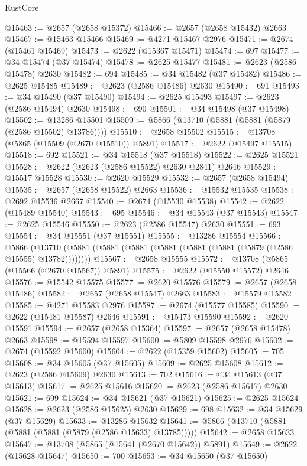 \begin{lexlean}{RustCore}
\begin{coremodule}
@15463 := @2657 (@2658 @15372)
@15466 := @2657 (@2658 @15432) @2663
@15467 := @15463 @15466
@15469 := @4271 @15467 @2976
@15471 := @2674 (@15461 @15469)
@15473 := @2622 (@15367 @15471)
@15474 := 697
@15477 := @34 @15474 (@37 @15474)
@15478 := @2625 @15477
@15481 := @2623 (@2586 @15478) @2630
@15482 := 694
@15485 := @34 @15482 (@37 @15482)
@15486 := @2625 @15485
@15489 := @2623 (@2586 @15486) @2630
@15490 := 691
@15493 := @34 @15490 (@37 @15490)
@15494 := @2625 @15493
@15497 := @2623 (@2586 @15494) @2630
@15498 := 690
@15501 := @34 @15498 (@37 @15498)
@15502 := @13286 @15501
@15509 := @5866 (@13710 (@5881 (@5881 (@5879 (@2586 @15502) @13786))))
@15510 := @2658 @15502
@15515 := @13708 (@5865 (@15509 (@2670 @15510)) @5891)
@15517 := @2622 (@15497 @15515)
@15518 := 692
@15521 := @34 @15518 (@37 @15518)
@15522 := @2625 @15521
@15528 := @2622 (@2623 (@2586 @15522) @2630 @2841) @2646
@15529 := @15517 @15528
@15530 := @2620 @15529
@15532 := @2657 (@2658 @15494)
@15535 := @2657 (@2658 @15522) @2663
@15536 := @15532 @15535
@15538 := @2692 @15536 @2667
@15540 := @2674 (@15530 @15538)
@15542 := @2622 (@15489 @15540)
@15543 := 695
@15546 := @34 @15543 (@37 @15543)
@15547 := @2625 @15546
@15550 := @2623 (@2586 @15547) @2630
@15551 := 693
@15554 := @34 @15551 (@37 @15551)
@15555 := @13286 @15554
@15566 := @5866
    (@13710 (@5881 (@5881 (@5881 (@5881 (@5881 (@5881 (@5879 (@2586 @15555) @13782))))))))
@15567 := @2658 @15555
@15572 := @13708 (@5865 (@15566 (@2670 @15567)) @5891)
@15575 := @2622 (@15550 @15572) @2646
@15576 := @15542 @15575
@15577 := @2620 @15576
@15579 := @2657 (@2658 @15486)
@15582 := @2657 (@2658 @15547) @2663
@15583 := @15579 @15582
@15585 := @4271 @15583 @2976
@15587 := @2674 (@15577 @15585)
@15590 := @2622 (@15481 @15587) @2646
@15591 := @15473 @15590
@15592 := @2620 @15591
@15594 := @2657 (@2658 @15364)
@15597 := @2657 (@2658 @15478) @2663
@15598 := @15594 @15597
@15600 := @5809 @15598 @2976
@15602 := @2674 (@15592 @15600)
@15604 := @2622 (@15359 @15602)
@15605 := 705
@15608 := @34 @15605 (@37 @15605)
@15609 := @2625 @15608
@15612 := @2623 (@2586 @15609) @2630
@15613 := 702
@15616 := @34 @15613 (@37 @15613)
@15617 := @2625 @15616
@15620 := @2623 (@2586 @15617) @2630
@15621 := 699
@15624 := @34 @15621 (@37 @15621)
@15625 := @2625 @15624
@15628 := @2623 (@2586 @15625) @2630
@15629 := 698
@15632 := @34 @15629 (@37 @15629)
@15633 := @13286 @15632
@15641 := @5866 (@13710 (@5881 (@5881 (@5881 (@5879 (@2586 @15633) @13785)))))
@15642 := @2658 @15633
@15647 := @13708 (@5865 (@15641 (@2670 @15642)) @5891)
@15649 := @2622 (@15628 @15647)
@15650 := 700
@15653 := @34 @15650 (@37 @15650)

\end{coremodule}
\end{lexlean}
